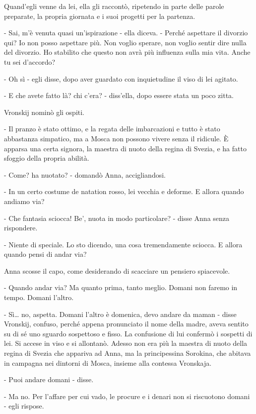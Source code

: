 Quand'egli venne da lei, ella gli raccontò, ripetendo in parte delle parole preparate, la propria giornata e i suoi progetti per la partenza. 

- Sai, m'è venuta quasi un'ispirazione - ella diceva. - Perché aspettare il divorzio qui? Io non posso aspettare più. Non voglio sperare, non voglio sentir dire nulla del divorzio. Ho stabilito che questo non avrà più influenza sulla mia vita. Anche tu sei d'accordo? 

- Oh sì - egli disse, dopo aver guardato con inquietudine il viso di lei agitato. 

- E che avete fatto là? chi c'era? - diss'ella, dopo essere stata un poco zitta. 

Vronskij nominò gli ospiti. 

- Il pranzo è stato ottimo, e la regata delle imbarcazioni e tutto è stato abbastanza simpatico, ma a Mosca non possono vivere senza il ridicule. È apparsa una certa signora, la maestra di nuoto della regina di Svezia, e ha fatto sfoggio della propria abilità. 

- Come? ha nuotato? - domandò Anna, accigliandosi. 

- In un certo costume de natation rosso, lei vecchia e deforme. E allora quando andiamo via? 

- Che fantasia sciocca! Be', nuota in modo particolare? - disse Anna senza rispondere. 

- Niente di speciale. Lo sto dicendo, una cosa tremendamente sciocca. E allora quando pensi di andar via? 

Anna scosse il capo, come desiderando di scacciare un pensiero spiacevole. 

- Quando andar via? Ma quanto prima, tanto meglio. Domani non faremo in tempo. Domani l'altro. 

- Sì\ldots{} no, aspetta. Domani l'altro è domenica, devo andare da maman - disse Vronskij, confuso, perché appena pronunciato il nome della madre, aveva sentito su di sé uno sguardo sospettoso e fisso. La confusione di lui confermò i sospetti di lei. Si accese in viso e si allontanò. Adesso non era più la maestra di nuoto della regina di Svezia che appariva ad Anna, ma la principessina Sorokina, che abitava in campagna nei dintorni di Mosca, insieme alla contessa Vronskaja. 

- Puoi andare domani - disse. 

- Ma no. Per l'affare per cui vado, le procure e i denari non si riscuotono domani - egli rispose. 

